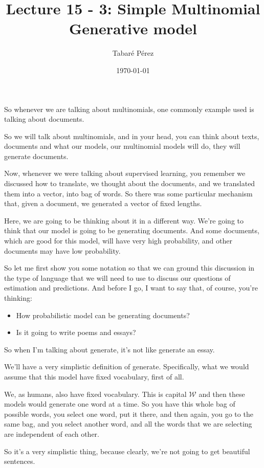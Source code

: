 \documentclass[a4paper, 12pt]{article}
\author{Tabaré Pérez}
\date{\today}
\title{Lecture 15 - 3: Simple Multinomial Generative model}
\begin{document}
\maketitle
So whenever we are talking about multinomials, one commonly example used is
talking about documents.

So we will talk about multinomials, and in your head, you can think about texts,
documents and what our models, our multinomial models will do, they will
generate documents.

Now, whenever we were talking about supervised learning, you remember we
discussed how to translate, we thought about the documents, and we translated
them into a vector, into bag of words. So there was some particular mechanism
that, given a document, we generated a vector of fixed lengths.

Here, we are going to be thinking about it in a different way. We're going to
think that our model is going to be generating documents. And some documents,
which are good for this model, will have very high probability, and other
documents may have low probability.

So let me first show you some notation so that we can ground this discussion in
the type of language that we will need to use to discuss our questions of
estimation and predictions. And before I go, I want to say that, of course,
you're thinking:

\begin{itemize}
\item How probabilistic model can be generating documents?
\item Is it going to write poems and essays?
\end{itemize}

So when I'm talking about generate, it's not like generate an essay.

We'll have a very simplistic definition of generate. Specifically, what we would
assume that this model have fixed vocabulary, first of all.

We, as humans, also have fixed vocabulary. This is capital \(\mathcal{W}\) and then
these models would generate one word at a time. So you have this whole bag of
possible words, you select one word, put it there, and then again, you go to the
same bag, and you select another word, and all the words that we are selecting
are independent of each other.

So it's a very simplistic thing, because clearly, we're not going to get
beautiful sentences.
\end{document}
